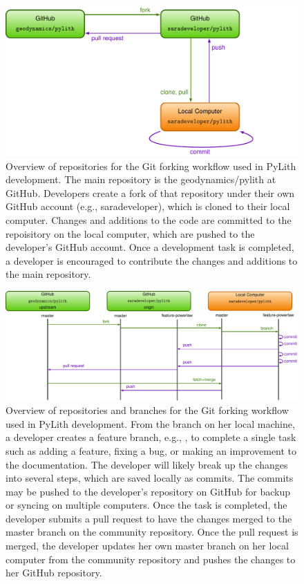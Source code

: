 \begin{figure}[htbp]
  \includegraphics[scale=0.7]{developer/figs/gitworkflow_repositories}
  \caption{Overview of repositories for the Git forking workflow used in PyLith
    development. The main repository is the
    geodynamics/pylith at GitHub. Developers create a fork
    of that repository under their own GitHub account (e.g.,
    saradeveloper), which is cloned to their local computer. Changes
    and additions to the code are committed to the repoisitory on the
    local computer, which are pushed to the developer's GitHub
    account. Once a development task is completed, a developer is
    encouraged to contribute the changes and additions to the main
    repository.}
  \label{fig:developer:git:repositories}
\end{figure}

\begin{figure}[htbp]
  \includegraphics[scale=0.7]{developer/figs/gitworkflow_branch}
  \caption{Overview of repositories and branches for the Git forking
    workflow used in PyLith development. From the 
    branch on her local machine, a developer creates a feature
    branch, e.g., , to complete a single
    task such as adding a feature, fixing a bug, or making an
    improvement to the documentation. The developer will likely break
    up the changes into several steps, which are saved locally as
    commits. The commits may be pushed to the developer's repository
    on GitHub for backup or syncing on multiple computers. Once the
    task is completed, the developer submits a pull request to have
    the changes merged to the master branch on the community
    repository. Once the pull request is merged, the developer updates
    her own master branch on her local computer from the community
    repository and pushes the changes to her GitHub repository.}
  \label{fig:developer:git:branch}
\end{figure}

